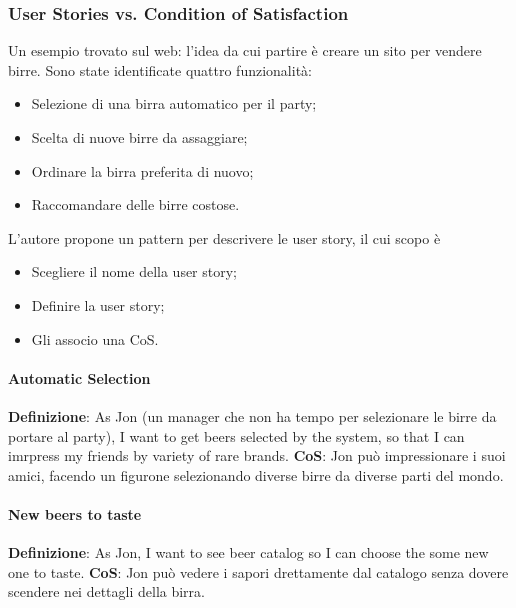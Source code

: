 \subsubsection{User Stories vs. Condition of Satisfaction}
Un esempio trovato sul web: l'idea da cui partire è creare un sito per vendere birre. Sono state identificate quattro funzionalità:
\begin{itemize}
	\item Selezione di una birra automatico per il party;
	\item Scelta di nuove birre da assaggiare;
	\item Ordinare la birra preferita di nuovo;
	\item Raccomandare delle birre costose.
\end{itemize}
L'autore propone un pattern per descrivere le user story, il cui scopo è
\begin{itemize}
	\item Scegliere il nome della user story;
	\item Definire la user story;
	\item Gli associo una CoS.
\end{itemize}

\paragraph{Automatic Selection}
\textbf{Definizione}: As Jon (un manager che non ha tempo per selezionare le birre da portare al party), I want to get beers selected by the system, so that I can imrpress my friends by variety of rare brands.\newline
\textbf{CoS}: Jon può impressionare i suoi amici, facendo un figurone selezionando diverse birre da diverse parti del mondo.\newline

\paragraph{New beers to taste}
\textbf{Definizione}: As Jon, I want to see beer catalog so I can choose the some new one to taste.\newline
\textbf{CoS}: Jon può vedere i sapori drettamente dal catalogo senza dovere scendere nei dettagli della birra.\newline

